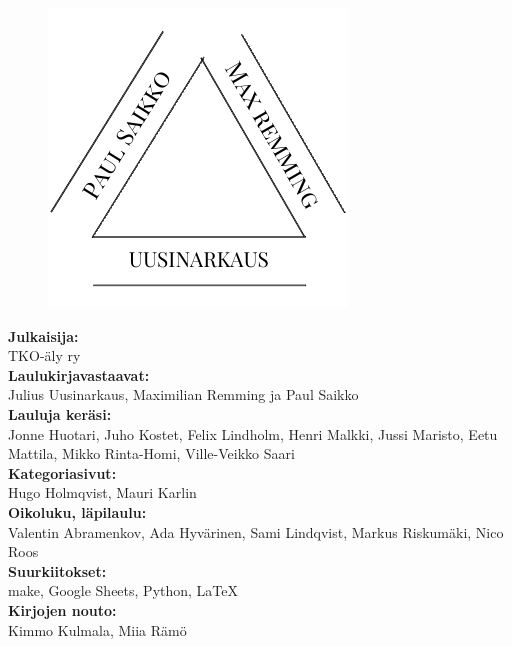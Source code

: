 


\newpage
\begin{figure}[t]
\vspace{-0.8cm}
\centering
\includegraphics[scale=0.70]{graphics/tekijat.pdf}
\vspace{-0.9cm}
\end{figure}

\noindent
\textbf{Julkaisija:} \\
\noindent
TKO-äly ry \\

\noindent
\textbf{Laulukirjavastaavat:} \\
\noindent
Julius Uusinarkaus, Maximilian Remming ja Paul Saikko \\

\noindent
\textbf{Lauluja keräsi:} \\
\noindent
Jonne Huotari, Juho Kostet, Felix Lindholm, Henri Malkki, Jussi Maristo, Eetu Mattila, Mikko Rinta-Homi, Ville-Veikko Saari\\

\noindent
\textbf{Kategoriasivut:} \\
\noindent
Hugo Holmqvist, Mauri Karlin \\

\noindent
\textbf{Oikoluku, läpilaulu:} \\
\noindent
Valentin Abramenkov, Ada Hyvärinen, Sami Lindqvist, Markus Riskumäki, Nico Roos\\

\noindent
\textbf{Suurkiitokset:} \\
\noindent
make, Google Sheets, Python, \LaTeX \\

\noindent
\textbf{Kirjojen nouto:} \\
\noindent
Kimmo Kulmala, Miia Rämö \\

